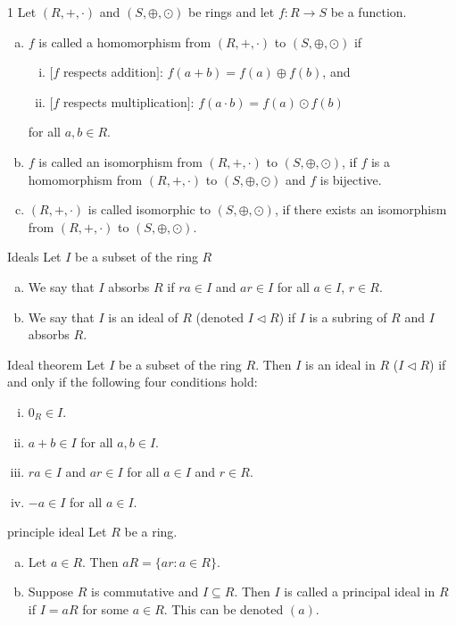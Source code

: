 \begin{defn}{1}
	Let $(R,+,\cdot)$ and $(S,\oplus,\odot)$ be rings and let $f:R\rightarrow S$ be a function.
	\begin{enumerate}[(a)]
		\item $f$ is called a homomorphism from $(R, +, \cdot)$ to $(S, \oplus,\odot)$ if
		\begin{enumerate}[(i)]
			\item $[f$ respects addition$]$: $f(a+b)=f(a)\oplus f(b)$, and
			\item  $[f$ respects multiplication$]$: $f(a\cdot b)=f(a)\odot f(b)$
		\end{enumerate}
		for all $a,b \in R$.
		\item $f$ is called an isomorphism from $(R, +, \cdot)$ to $(S, \oplus, \odot)$, if $f$ is a homomorphism from $(R, +, \cdot)$
		to $(S, \oplus, \odot)$ and $f$ is bijective.
		\item $(R, +, \cdot)$ is called isomorphic to $(S, \oplus, \odot)$, if there exists an isomorphism from $(R, +, \cdot)$ to	$(S, \oplus, \odot)$.
	\end{enumerate}
\end{defn}
\begin{defn}[Ideal]{Ideals}
	Let $I$ be a subset of the ring $R$
	\begin{enumerate}[(a)]
		\item We say that $I$ absorbs $R$ if $ra \in I$ and $ar \in I$ for all $a \in I$, $r\in R$.
		\item We say that $I$ is an ideal of $R$ (denoted $I \lhd R$) if $I$ is a subring of $R$ and $I$ absorbs $R$. 
	\end{enumerate}
\end{defn}
\begin{theo}{Ideal theorem}
	Let $I$ be a subset of the ring $R$. Then $I$ is an ideal in $R$ ($I \lhd R$) if and only if the following four conditions hold:
	\begin{enumerate}[(i)]
		\item $0_R \in I$.
		\item $a+b\in I$ for all $a,b \in I$.
		\item $ra \in I$ and $ar \in I$ for all $a \in I$ and $r \in R$.
		\item $-a\in I$ for all $a \in I$.
	\end{enumerate}
\end{theo}
\begin{defn}{principle ideal}
	Let $R$ be a ring.
	\begin{enumerate}[(a)]
		\item Let $a \in R$. Then $aR = \{ar: a \in R \}$.
		\item Suppose $R$ is commutative and $I \subseteq R$. Then $I$ is called a principal ideal in $R$ if $I = aR$ for
		some $a \in R$. This can be denoted $(a)$.
	\end{enumerate}
\end{defn}

